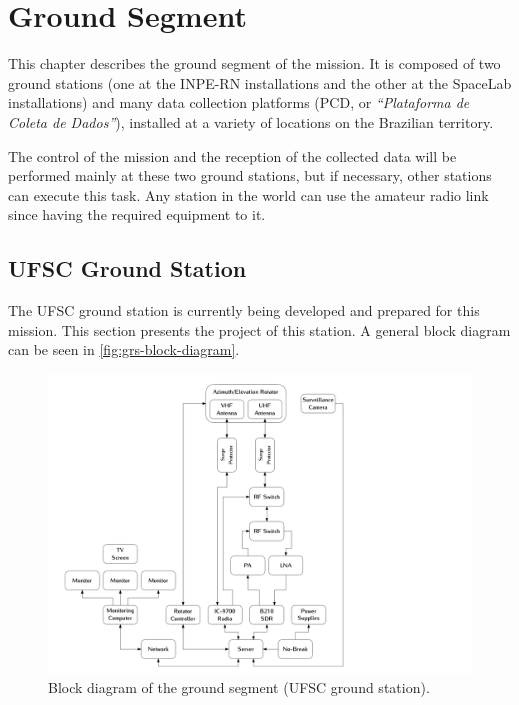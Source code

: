 %
%
%
%
%

%
%
%
%
%

\chapter{Ground Segment} \label{ch:ground-segment}

This chapter describes the ground segment of the mission. It is composed of two ground stations (one at the INPE-RN installations and the other at the SpaceLab installations) and many data collection platforms (PCD, or \textit{``Plataforma de Coleta de Dados''}), installed at a variety of locations on the Brazilian territory.

The control of the mission and the reception of the collected data will be performed mainly at these two ground stations, but if necessary, other stations can execute this task. Any station in the world can use the amateur radio link since having the required equipment to it.

\section{UFSC Ground Station}

The UFSC ground station is currently being developed and prepared for this mission. This section presents the project of this station. A general block diagram can be seen in \autoref{fig:grs-block-diagram}.

\begin{figure}[!ht]
    \begin{center}
        \includegraphics[width=\textwidth]{figures/grs-block-diagram.pdf}
        \caption{Block diagram of the ground segment (UFSC ground station).}
        \label{fig:grs-block-diagram}
    \end{center}
\end{figure}

